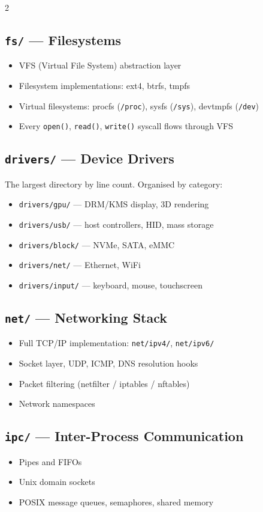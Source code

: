 2\documentclass[11pt,a4paper]{article}
\begin{document}
\subsection{\texttt{fs/} --- Filesystems}
\begin{itemize}[noitemsep]
  \item VFS (Virtual File System) abstraction layer
  \item Filesystem implementations: ext4, btrfs, tmpfs
  \item Virtual filesystems: procfs (\texttt{/proc}), sysfs (\texttt{/sys}), devtmpfs (\texttt{/dev})
  \item Every \texttt{open()}, \texttt{read()}, \texttt{write()} syscall flows through VFS
\end{itemize}

\subsection{\texttt{drivers/} --- Device Drivers}
The largest directory by line count. Organised by category:
\begin{itemize}[noitemsep]
  \item \texttt{drivers/gpu/} --- DRM/KMS display, 3D rendering
  \item \texttt{drivers/usb/} --- host controllers, HID, mass storage
  \item \texttt{drivers/block/} --- NVMe, SATA, eMMC
  \item \texttt{drivers/net/} --- Ethernet, WiFi
  \item \texttt{drivers/input/} --- keyboard, mouse, touchscreen
\end{itemize}

\subsection{\texttt{net/} --- Networking Stack}
\begin{itemize}[noitemsep]
  \item Full TCP/IP implementation: \texttt{net/ipv4/}, \texttt{net/ipv6/}
  \item Socket layer, UDP, ICMP, DNS resolution hooks
  \item Packet filtering (netfilter / iptables / nftables)
  \item Network namespaces
\end{itemize}

\subsection{\texttt{ipc/} --- Inter-Process Communication}
\begin{itemize}[noitemsep]
  \item Pipes and FIFOs
  \item Unix domain sockets
  \item POSIX message queues, semaphores, shared memory
\end{itemize}
\end{document}
